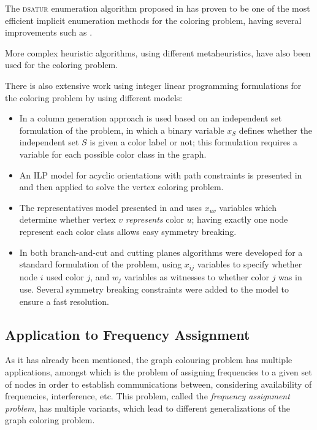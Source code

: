 The \textsc{dsatur} enumeration algorithm proposed in \cite{brelaz1979new} has proven to be one of the most efficient implicit enumeration methods for the coloring problem, having several improvements such as \cite{sewell1996improved}.

More complex heuristic algorithms, using different metaheuristics, have also been used for the coloring problem.

There is also extensive work using integer linear programming formulations for the coloring problem by using different models:
\begin{itemize}
\item{In \cite{mehrotra1996column} a column generation approach is used based on an independent set formulation of the problem, in which a binary variable $x_S$ defines whether the independent set $S$ is given a color label or not; this formulation requires a variable for each possible color class in the graph.}
\item{An ILP model for acyclic orientations with path constraints is presented in \cite{figueiredo2005acyclic} and then applied to solve the vertex coloring problem.}
\item{The representatives model presented in \cite{campelo2004cliques} and \cite{campelo2008asymmetric} uses $x_{uv}$ variables which determine whether vertex $v$ \textit{represents} color $u$; having exactly one node represent each color class allows easy symmetry breaking.}
\item{In \cite{mendez2006branch,mendez2008cutting} both branch-and-cut and cutting planes algorithms were developed for a standard formulation of the problem, using $x_{ij}$ variables to specify whether node $i$ used color $j$, and $w_j$ variables as witnesses to whether color $j$ was in use. Several symmetry breaking constraints were added to the model to ensure a fast resolution.}
\end{itemize}

\subsection*{Application to Frequency Assignment}

As it has already been mentioned, the graph colouring problem has multiple applications, amongst which is the problem of assigning frequencies to a given set of nodes in order to establish communications between, considering availability of frequencies, interference, etc. This problem, called the \textit{frequency assignment problem}, has multiple variants, which lead to different generalizations of the graph coloring problem.

